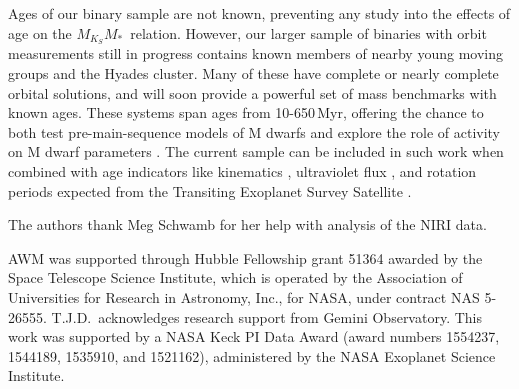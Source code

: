 \documentclass[twocolumn]{aastex62}
\newcommand{\mks}{$M_{K_S}$}
\newcommand{\mmk}{$M_{K_S}$\textendash$M_*$}
\begin{document}

Ages of our binary sample are not known, preventing any study into the effects of age on the \mmk\ relation. However, our larger sample of binaries with orbit measurements still in progress contains known members of nearby young moving groups and the Hyades cluster. Many of these have complete or nearly complete orbital solutions, and will soon provide a powerful set of mass benchmarks with known ages. These systems span ages from 10-650\,Myr, offering the chance to both test pre-main-sequence models of M dwarfs \citep{2015ApJ...813L..11M,2016ApJ...817..164R,2016ApJ...818..156C,2016AJ....152..175N} and explore the role of activity on M dwarf parameters \citep[e.g.,][]{Spada2013,Kesseli:2018aa}. The current sample can be included in such work when combined with age indicators like kinematics \citep{2018MNRAS.tmp..966W}, ultraviolet flux \citep{Ansdell2015}, and rotation periods expected from the Transiting Exoplanet Survey Satellite \citep[{\it TESS},][]{2014SPIE.9143E..20R}. 


\acknowledgements
The authors thank Meg Schwamb for her help with analysis of the NIRI data. 

AWM was supported through Hubble Fellowship grant 51364 awarded by the Space Telescope Science Institute, which is operated by the Association of Universities for Research in Astronomy, Inc., for NASA, under contract NAS 5-26555. T.J.D.\ acknowledges research support from Gemini Observatory. This work was supported by a NASA Keck PI Data Award (award numbers 1554237, 1544189, 1535910, and 1521162), administered by the NASA Exoplanet Science Institute. 
\end{document}
